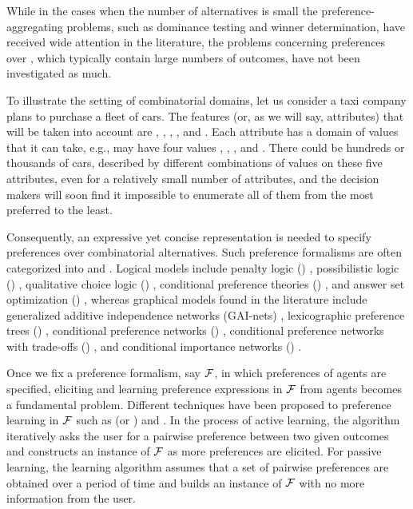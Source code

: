 While in the cases when the
number of alternatives is small the preference-aggregating 
problems, such as dominance testing and winner determination,
have received wide attention in the literature,
the problems concerning preferences over , which typically contain large numbers of outcomes, 
have not been investigated as much.

To illustrate the setting of combinatorial domains, let us consider
a taxi company plans to purchase a fleet of cars.
The features (or, as we will say, attributes) that will be
taken into account are , ,
, , and .  
Each attribute has a domain of values that it can take, e.g.,
 may have four values , , , and .
There could be hundreds or thousands of cars,
described by different combinations of values on these five attributes, 
even for a relatively small number of attributes, and
the decision makers will soon find it impossible to enumerate all of
them from the most preferred to the least.

Consequently, an expressive yet concise representation is needed to specify
preferences over combinatorial alternatives.
Such preference formalisms are often categorized into  and
.
Logical models include penalty logic () \cite{haddawy1992representations}, 
possibilistic logic () \cite{DuboisLP91},
qualitative choice logic () \cite{brewka2004qualitative},
conditional preference theories () \cite{Wilson04extendingcp-nets},
and answer set optimization () \cite{Brewka:ASO},
whereas graphical models found in the literature include
generalized additive independence networks (GAI-nets) \cite{BacchusG95,LIP61766},
lexicographic preference trees () \cite{booth:learningLP,conf/adt13/LiuT},
conditional preference networks () \cite{Kaci:Pref},
conditional preference networks with trade-offs () \cite{BrafmanD02:TCP},
and conditional importance networks () \cite{Kaci:Pref}.

Once we fix a preference formalism, say $\mathcal{F}$, in which preferences of agents
are specified, eliciting and learning preference expressions in $\mathcal{F}$ from agents
becomes a fundamental problem.
Different techniques have been proposed to preference learning
in $\mathcal{F}$
such as  (or ) and 
 \cite{Furnkranz:pref_learning}.
In the process of
active learning, the algorithm iteratively asks the user for a pairwise 
preference between two given outcomes and constructs
an instance of $\mathcal{F}$ as more preferences are elicited.
For passive learning, the learning algorithm assumes that a set of
pairwise preferences are obtained over a period of time and builds an instance
of $\mathcal{F}$ with no more information from the user.

